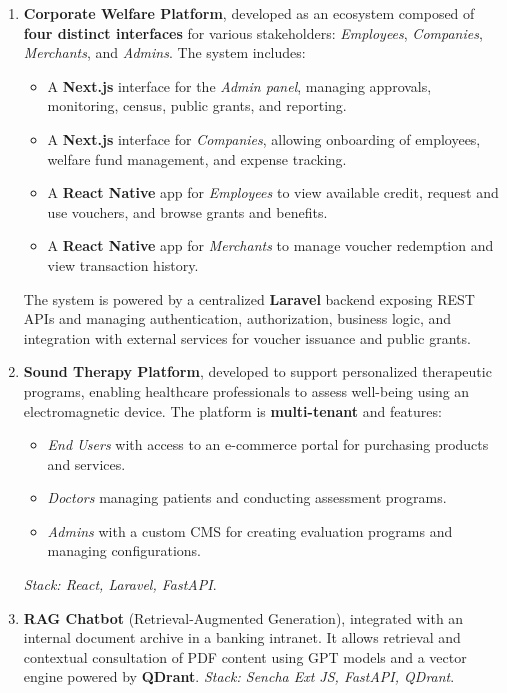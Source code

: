 \begin{experiences}
{\begin{itemize}
	\begin{enumerate}
	\item \textbf{Corporate Welfare Platform}, developed as an ecosystem composed of \textbf{four distinct interfaces} for various stakeholders: \textit{Employees}, \textit{Companies}, \textit{Merchants}, and \textit{Admins}. The system includes:
	\begin{itemize}
		\item A \textbf{Next.js} interface for the \textit{Admin panel}, managing approvals, monitoring, census, public grants, and reporting.
		\item A \textbf{Next.js} interface for \textit{Companies}, allowing onboarding of employees, welfare fund management, and expense tracking.
		\item A \textbf{React Native} app for \textit{Employees} to view available credit, request and use vouchers, and browse grants and benefits.
		\item A \textbf{React Native} app for \textit{Merchants} to manage voucher redemption and view transaction history.
	\end{itemize}
	The system is powered by a centralized \textbf{Laravel} backend exposing REST APIs and managing authentication, authorization, business logic, and integration with external services for voucher issuance and public grants.

	\item \textbf{Sound Therapy Platform}, developed to support personalized therapeutic programs, enabling healthcare professionals to assess well-being using an electromagnetic device. The platform is \textbf{multi-tenant} and features:
	\begin{itemize}
		\item \textit{End Users} with access to an e-commerce portal for purchasing products and services.
		\item \textit{Doctors} managing patients and conducting assessment programs.
		\item \textit{Admins} with a custom CMS for creating evaluation programs and managing configurations.
	\end{itemize}
	\textit{Stack: React, Laravel, FastAPI}.

	\item \textbf{RAG Chatbot} (Retrieval-Augmented Generation), integrated with an internal document archive in a banking intranet. It allows retrieval and contextual consultation of PDF content using GPT models and a vector engine powered by \textbf{QDrant}. \textit{Stack: Sencha Ext JS, FastAPI, QDrant}.


\end{enumerate}
\end{itemize}}
\end{experiences}
